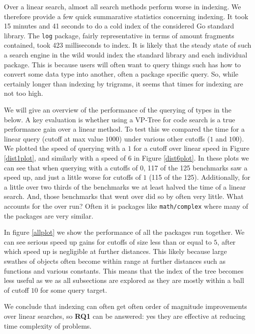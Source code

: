 Over a linear search, almost all search methods perform worse in indexing.
We therefore provide a few quick summarative statistics concerning indexing.
It took 15 minutes and 41 seconds to do a cold index of the considered Go standard library.
The \texttt{log} package, fairly representative in terms of amount fragments contained,
took 423 milliseconds to index. 
It is likely that the steady state of such a search engine in the wild would index the standard library and each individual package.
This is because users will often want to query things such has how to convert some data type into another, often a package specific query.
So, while certainly longer than indexing by trigrams, it seems that times for indexing are not too high.

We will give an overview of the performance of the querying of types in the below.
A key evaluation is whether using a VP-Tree for code search is a true performance gain over a linear method.
To test this we compared the time for a linear query (cutoff at max value $1000$) under various other cutoffs ($1$ and $100$).
We plotted the speed of querying with a $1$ for a cutoff over linear speed in Figure \ref{dist1plot},
and similarly with a speed of $6$ in Figure \ref{dist6plot}.
In these plots we can see that when querying with a cutoffs of $0$, 117 of the 125 benchmarks saw a speed up,
and just a little worse for cutoffs of $1$ (115 of the 125).
Additionally, for a little over two thirds of the benchmarks we at least halved the time of a linear search.
And, those benchmarks that went over did so by often very little.
What accounts for the over run?
Often it is packages like \texttt{math/complex} where many of the packages are very similar.

In figure \ref{allplot} we show the performance of all the packages run together.
We can see serious speed up gains for cutoffs of size less than or equal to $5$,
after which speed up is negligible at further distances.
This likely because large swathes of objects often become within range at further distances such as functions and various constants.
This means that the index of the tree becomes less useful as we as all subsections are explored as they are mostly within 
a ball of cutoff $10$ for some query target. 

We conclude that indexing can often get often order of magnitude improvements over linear searches,
so \textbf{RQ1} can be answered: 
yes they are effective at reducing time complexity of problems.

